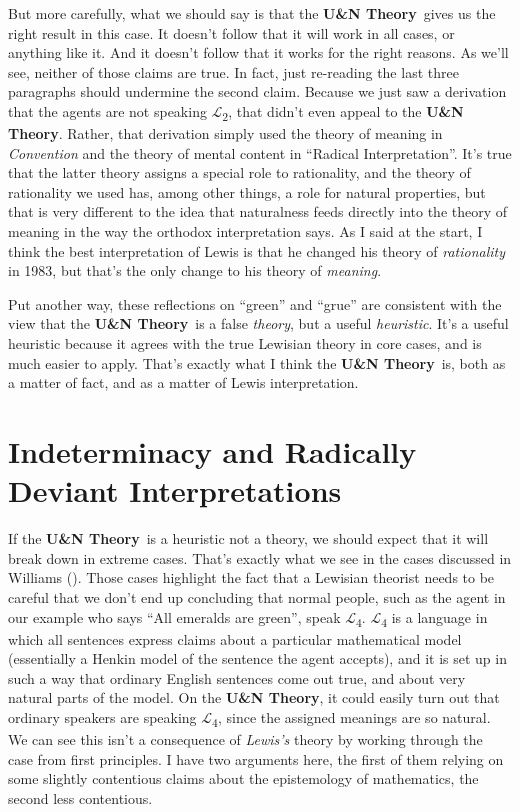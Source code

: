 \documentclass[
  10pt,
  letterpaper,
  DIV=11,
  numbers=noendperiod,
  twoside]{scrartcl}
\begin{document}
But more carefully, what we should say is that the \textbf{U\&N
Theory}~gives us the right result in this case. It doesn't follow that
it will work in all cases, or anything like it. And it doesn't follow
that it works for the right reasons. As we'll see, neither of those
claims are true. In fact, just re-reading the last three paragraphs
should undermine the second claim. Because we just saw a derivation that
the agents are not speaking \(\mathcal{L}\)\textsubscript{2}, that
didn't even appeal to the \textbf{U\&N Theory}. Rather, that derivation
simply used the theory of meaning in \emph{Convention} and the theory of
mental content in ``Radical Interpretation''. It's true that the latter
theory assigns a special role to rationality, and the theory of
rationality we used has, among other things, a role for natural
properties, but that is very different to the idea that naturalness
feeds directly into the theory of meaning in the way the orthodox
interpretation says. As I said at the start, I think the best
interpretation of Lewis is that he changed his theory of
\emph{rationality} in 1983, but that's the only change to his theory of
\emph{meaning}.

Put another way, these reflections on ``green'' and ``grue'' are
consistent with the view that the \textbf{U\&N Theory}~is a false
\emph{theory}, but a useful \emph{heuristic}. It's a useful heuristic
because it agrees with the true Lewisian theory in core cases, and is
much easier to apply. That's exactly what I think the \textbf{U\&N
Theory}~is, both as a matter of fact, and as a matter of Lewis
interpretation.

\section{Indeterminacy and Radically Deviant
Interpretations}\label{indeterminacy-and-radically-deviant-interpretations}

If the \textbf{U\&N Theory}~is a heuristic not a theory, we should
expect that it will break down in extreme cases. That's exactly what we
see in the cases discussed in Williams
(). Those cases highlight the fact that
a Lewisian theorist needs to be careful that we don't end up concluding
that normal people, such as the agent in our example who says ``All
emeralds are green'', speak \(\mathcal{L}\)\textsubscript{4}.
\(\mathcal{L}\)\textsubscript{4} is a language in which all sentences
express claims about a particular mathematical model (essentially a
Henkin model of the sentence the agent accepts), and it is set up in
such a way that ordinary English sentences come out true, and about very
natural parts of the model. On the \textbf{U\&N Theory}, it could easily
turn out that ordinary speakers are speaking
\(\mathcal{L}\)\textsubscript{4}, since the assigned meanings are so
natural. We can see this isn't a consequence of \emph{Lewis's} theory by
working through the case from first principles. I have two arguments
here, the first of them relying on some slightly contentious claims
about the epistemology of mathematics, the second less contentious.
\end{document}
